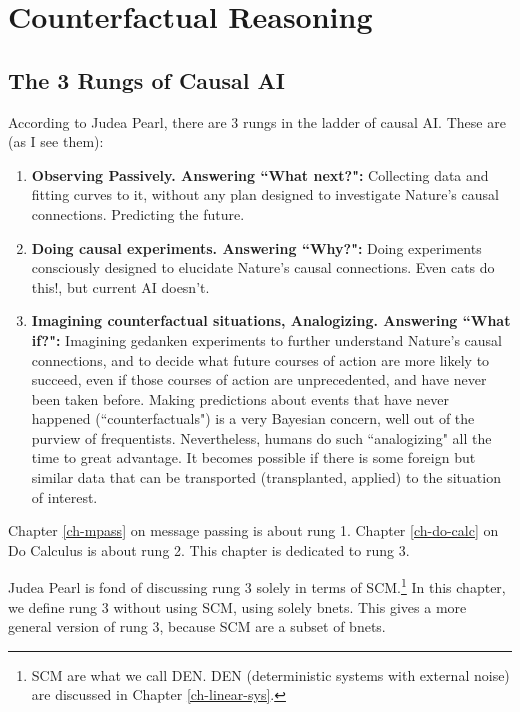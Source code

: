 \chapter{Counterfactual Reasoning}
\label{ch-counterf}


\section{The 3 Rungs of Causal AI}
According to
Judea Pearl,
there are 3 rungs in the
ladder of causal AI.
These are (as I see them):
\begin{enumerate}
\item
{\bf Observing Passively. Answering ``What next?":} Collecting
data
and fitting curves to it,
without any plan
designed to
investigate Nature's
causal connections. Predicting the future.
\item {\bf Doing causal
experiments. Answering ``Why?":}
Doing experiments
consciously designed to
elucidate
Nature's causal connections.
Even cats do this!, but current AI doesn't.
\item {\bf Imagining
 counterfactual situations, Analogizing. Answering ``What if?":}
Imagining gedanken experiments
to further understand
Nature's causal connections,
and to decide what future
courses of action are
more likely to succeed,
even if
those courses of action
are unprecedented, and have never been taken before.
Making
predictions about
 events that have never happened (``counterfactuals")
is a very Bayesian
concern, well out of the purview of
frequentists. Nevertheless,
humans do such
``analogizing"
all the time to great advantage.
It becomes
possible if there
is some foreign but similar
data that can be transported
(transplanted, applied)
to the situation of
interest.


\end{enumerate}





Chapter \ref{ch-mpass}
on message passing
is about rung 1.
Chapter \ref{ch-do-calc}
on Do Calculus is about rung 2.
This chapter is dedicated to rung 3.

Judea Pearl
is fond of discussing rung 3 solely
in terms of SCM.\footnote{SCM are
what we call DEN. DEN (deterministic systems
with external noise) are discussed in
Chapter \ref{ch-linear-sys}. }
In this chapter,
we define rung 3
without using SCM, using solely
bnets.
This gives a more general
version of rung 3,
because SCM are a subset of bnets.




